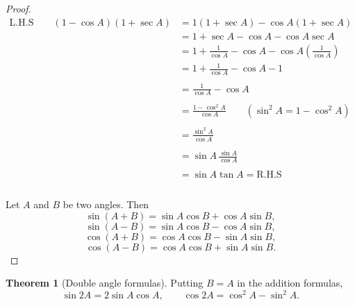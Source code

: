 \documentclass[11pt,a4paper]{article}
\theoremstyle{definition}
\newtheorem{thm}{Theorem}[section]
\begin{document}
\begin{proof}

\begin{align*}
\text{L.H.S}\qquad  (1 - \cos A)(1 + \sec A) & = 1 (1 + \sec A) - \cos A (1 + \sec A)\\
& = 1 + \sec A - \cos A - \cos A\sec A\\
& = 1 + \frac{1}{\cos A} - \cos A - \cos A\left(\frac{1}{\cos A}\right)\\
& = 1 + \frac{1}{\cos A} - \cos A - 1\\\\
& = \frac{1}{\cos A}-\cos A\\\\
& = \frac{1 - \cos^2 A}{\cos A}\qquad  \left(\sin^{2}A = 1 - \cos^{2}A\right)\\\\
& = \frac{\sin^2A}{\cos A}\\\\
& = \sin A\,\frac{\sin A}{\cos A}\\\\
& = \sin A \tan A = \text{R.H.S}\\\\
\end{align*}











Let $A$ and $B$ be two angles. Then
$$\sin (A + B) = \sin A \cos B + \cos A \sin B,$$
$$\sin (A - B) = \sin A \cos B - \cos A \sin B,$$
$$\cos (A + B) = \cos A \cos B - \sin A \sin B,$$
$$\cos (A - B) = \cos A \cos B + \sin A \sin B.$$
\end{proof}

\begin{thm}[Double angle formulas]
Putting $B=A$ in the addition formulas,
$$\sin 2A = 2\sin A\cos A,\qquad \cos 2A = \cos^{2}A - \sin^{2}A .$$
\end{thm}
\end{document}
